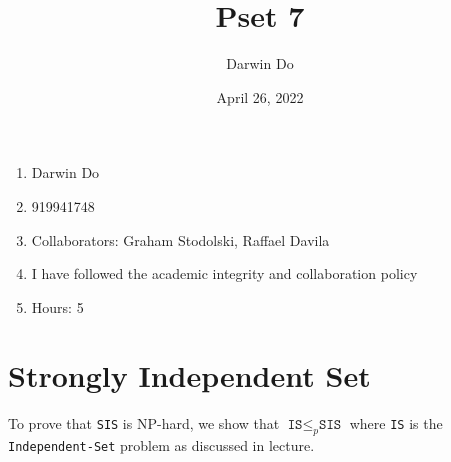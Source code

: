 \documentclass{article}
\title{Pset 7}
\begin{document}
\newcommand{\Not}{\textbf{not}}
\newcommand{\AAnd}{\textbf{and}}
\newcommand{\Or}{\textbf{or}}
\newcommand{\True}{\texttt{True}}
\newcommand{\False}{\texttt{False}}

\date{April 26, 2022 }
\author{Darwin Do}

\maketitle

\begin{enumerate}
    \item Darwin Do
    \item 919941748
    \item Collaborators: Graham Stodolski, Raffael Davila
    \item I have followed the academic integrity and collaboration policy
    \item Hours: 5
\end{enumerate}

\newpage

\section{Strongly Independent Set}

To prove that \texttt{SIS} is NP-hard, we show that $\texttt{IS} \leq_p \texttt{SIS}$ where \texttt{IS} is the \texttt{Independent-Set} problem as discussed in lecture.
\end{document}
